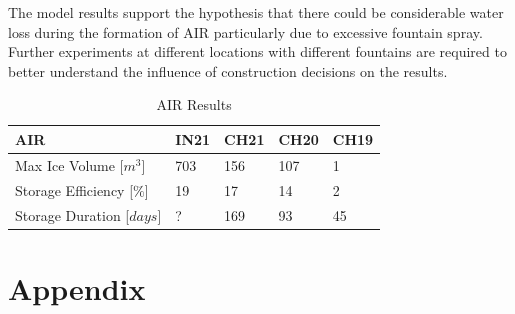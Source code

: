 \documentclass[utf8]{frontiersSCNS} %
\begin{document}

The model results support the hypothesis that there could be considerable water loss during the formation of AIR
particularly due to excessive fountain spray. Further experiments at different locations with different fountains are
required to better understand the influence of construction decisions on the results. 

\begin{table}[]
\centering
\caption{AIR Results}
\label{table:results}
\begin{tabular}{@{}|l|l|l|l|l|@{}}
\toprule
\textbf{AIR}   & \textbf{IN21} & \textbf{CH21} & \textbf{CH20} & \textbf{CH19} \\ \midrule
Max Ice Volume [$m^3$] & 703             & 156             & 107             & 1             \\ \midrule
Storage Efficiency [$\%$] & 19             & 17             & 14             & 2             \\ \midrule
Storage Duration [$days$] & ?             & 169             & 93             & 45             \\ \bottomrule
\end{tabular}
\end{table}


\section{Appendix}
\end{document}
